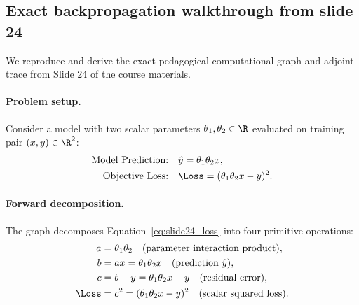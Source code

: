 \documentclass[../../main.tex]{subfiles}
\begin{document}
\subsection{Exact backpropagation walkthrough from slide 24}
We reproduce and derive the exact pedagogical computational graph and adjoint trace from Slide 24 of the course materials.

\paragraph{Problem setup.}
Consider a model with two scalar parameters $\theta_1, \theta_2 \in \R$ evaluated on training pair $(x, y) \in \R^2$:
\begin{align}
\text{Model Prediction:} \quad &\hat{y} = \theta_1 \theta_2 x, \label{eq:slide24_model} \\
\text{Objective Loss:} \quad &\Loss = (\theta_1 \theta_2 x - y)^2. \label{eq:slide24_loss}
\end{align}

\paragraph{Forward decomposition.}
The graph decomposes Equation~\eqref{eq:slide24_loss} into four primitive operations:
\begin{align}
a &= \theta_1 \theta_2 \quad (\text{parameter interaction product}), \label{eq:fwd_a} \\
b &= a x = \theta_1 \theta_2 x \quad (\text{prediction } \hat{y}), \label{eq:fwd_b} \\
c &= b - y = \theta_1 \theta_2 x - y \quad (\text{residual error}), \label{eq:fwd_c} \\
\Loss &= c^2 = (\theta_1 \theta_2 x - y)^2 \quad (\text{scalar squared loss}). \label{eq:fwd_L}
\end{align}
\end{document}
